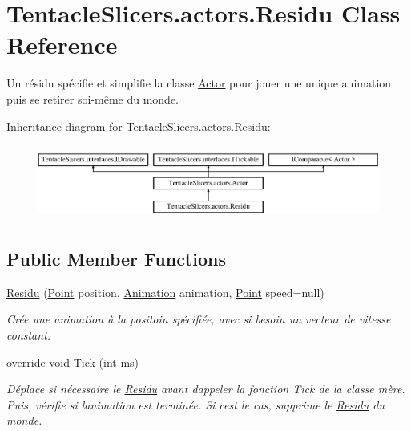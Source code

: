 \hypertarget{class_tentacle_slicers_1_1actors_1_1_residu}{}\section{Tentacle\+Slicers.\+actors.\+Residu Class Reference}
\label{class_tentacle_slicers_1_1actors_1_1_residu}


Un résidu spécifie et simplifie la classe \hyperlink{class_tentacle_slicers_1_1actors_1_1_actor}{Actor} pour jouer une unique animation puis se retirer soi-\/même du monde.  


Inheritance diagram for Tentacle\+Slicers.\+actors.\+Residu\+:\begin{figure}[H]
\begin{center}
\leavevmode
\includegraphics[height=2.456140cm]{class_tentacle_slicers_1_1actors_1_1_residu}
\end{center}
\end{figure}
\subsection*{Public Member Functions}
\begin{DoxyCompactItemize}
\item 
\hyperlink{class_tentacle_slicers_1_1actors_1_1_residu_ae5669338f5bde8a3f2ce7246c9101dd9}{Residu} (\hyperlink{class_tentacle_slicers_1_1general_1_1_point}{Point} position, \hyperlink{class_tentacle_slicers_1_1graphics_1_1_animation}{Animation} animation, \hyperlink{class_tentacle_slicers_1_1general_1_1_point}{Point} speed=null)
\begin{DoxyCompactList}\small\item\em Crée une animation à la positoin spécifiée, avec si besoin un vecteur de vitesse constant. \end{DoxyCompactList}\item 
override void \hyperlink{class_tentacle_slicers_1_1actors_1_1_residu_a429af1b4c0a6bdbb4cb2e42a1f3ba571}{Tick} (int ms)
\begin{DoxyCompactList}\small\item\em Déplace si nécessaire le \hyperlink{class_tentacle_slicers_1_1actors_1_1_residu}{Residu} avant d\textquotesingle{}appeler la fonction Tick de la classe mère. Puis, vérifie si l\textquotesingle{}animation est terminée. Si c\textquotesingle{}est le cas, supprime le \hyperlink{class_tentacle_slicers_1_1actors_1_1_residu}{Residu} du monde. \end{DoxyCompactList}\end{DoxyCompactItemize}
